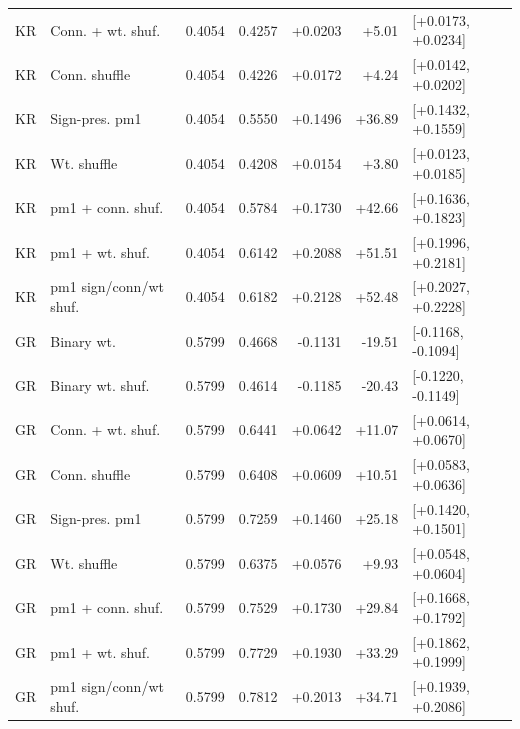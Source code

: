 \begin{tabular}{llrrrrl}
KR & Conn. + wt. shuf. & 0.4054 & 0.4257 & +0.0203 & +5.01 & [+0.0173, +0.0234] \\
KR & Conn. shuffle & 0.4054 & 0.4226 & +0.0172 & +4.24 & [+0.0142, +0.0202] \\
KR & Sign-pres. pm1 & 0.4054 & 0.5550 & +0.1496 & +36.89 & [+0.1432, +0.1559] \\
KR & Wt. shuffle & 0.4054 & 0.4208 & +0.0154 & +3.80 & [+0.0123, +0.0185] \\
KR & pm1 + conn. shuf. & 0.4054 & 0.5784 & +0.1730 & +42.66 & [+0.1636, +0.1823] \\
KR & pm1 + wt. shuf. & 0.4054 & 0.6142 & +0.2088 & +51.51 & [+0.1996, +0.2181] \\
KR & pm1 sign/conn/wt shuf. & 0.4054 & 0.6182 & +0.2128 & +52.48 & [+0.2027, +0.2228] \\
GR & Binary wt. & 0.5799 & 0.4668 & -0.1131 & -19.51 & [-0.1168, -0.1094] \\
GR & Binary wt. shuf. & 0.5799 & 0.4614 & -0.1185 & -20.43 & [-0.1220, -0.1149] \\
GR & Conn. + wt. shuf. & 0.5799 & 0.6441 & +0.0642 & +11.07 & [+0.0614, +0.0670] \\
GR & Conn. shuffle & 0.5799 & 0.6408 & +0.0609 & +10.51 & [+0.0583, +0.0636] \\
GR & Sign-pres. pm1 & 0.5799 & 0.7259 & +0.1460 & +25.18 & [+0.1420, +0.1501] \\
GR & Wt. shuffle & 0.5799 & 0.6375 & +0.0576 & +9.93 & [+0.0548, +0.0604] \\
GR & pm1 + conn. shuf. & 0.5799 & 0.7529 & +0.1730 & +29.84 & [+0.1668, +0.1792] \\
GR & pm1 + wt. shuf. & 0.5799 & 0.7729 & +0.1930 & +33.29 & [+0.1862, +0.1999] \\
GR & pm1 sign/conn/wt shuf. & 0.5799 & 0.7812 & +0.2013 & +34.71 & [+0.1939, +0.2086] \\
\bottomrule
\end{tabular}
